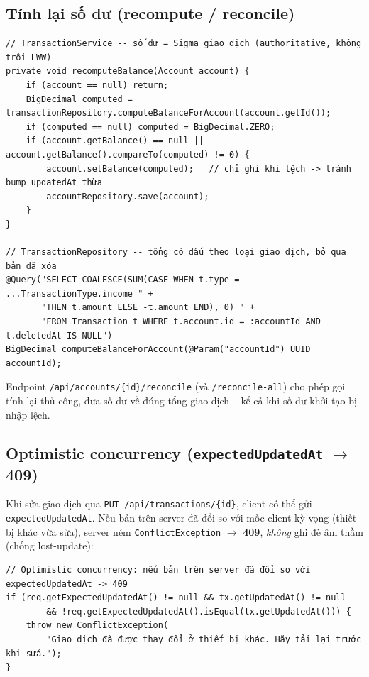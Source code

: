 \documentclass[11pt,a4paper]{article}
\begin{document}
\subsection{Tính lại số dư (recompute / reconcile)}

\begin{lstlisting}[style=java,caption={TransactionService.recomputeBalance \& truy vấn computeBalanceForAccount}]
// TransactionService -- số dư = Sigma giao dịch (authoritative, không trôi LWW)
private void recomputeBalance(Account account) {
    if (account == null) return;
    BigDecimal computed = transactionRepository.computeBalanceForAccount(account.getId());
    if (computed == null) computed = BigDecimal.ZERO;
    if (account.getBalance() == null || account.getBalance().compareTo(computed) != 0) {
        account.setBalance(computed);   // chỉ ghi khi lệch -> tránh bump updatedAt thừa
        accountRepository.save(account);
    }
}

// TransactionRepository -- tổng có dấu theo loại giao dịch, bỏ qua bản đã xóa
@Query("SELECT COALESCE(SUM(CASE WHEN t.type = ...TransactionType.income " +
       "THEN t.amount ELSE -t.amount END), 0) " +
       "FROM Transaction t WHERE t.account.id = :accountId AND t.deletedAt IS NULL")
BigDecimal computeBalanceForAccount(@Param("accountId") UUID accountId);
\end{lstlisting}

Endpoint \texttt{/api/accounts/\{id\}/reconcile} (và \texttt{/reconcile-all}) cho phép gọi tính
lại thủ công, đưa số dư về đúng tổng giao dịch -- kể cả khi số dư khởi tạo bị nhập lệch.

\subsection{Optimistic concurrency (\texttt{expectedUpdatedAt} $\rightarrow$ 409)}

Khi sửa giao dịch qua \texttt{PUT /api/transactions/\{id\}}, client có thể gửi
\texttt{expectedUpdatedAt}. Nếu bản trên server đã đổi so với mốc client kỳ vọng (thiết bị khác
vừa sửa), server ném \texttt{ConflictException} $\rightarrow$ \textbf{409}, \emph{không} ghi đè
âm thầm (chống lost-update):

\begin{lstlisting}[style=java,caption={TransactionService.updateTransaction -- optimistic concurrency check}]
// Optimistic concurrency: nếu bản trên server đã đổi so với expectedUpdatedAt -> 409
if (req.getExpectedUpdatedAt() != null && tx.getUpdatedAt() != null
        && !req.getExpectedUpdatedAt().isEqual(tx.getUpdatedAt())) {
    throw new ConflictException(
        "Giao dịch đã được thay đổi ở thiết bị khác. Hãy tải lại trước khi sửa.");
}
\end{lstlisting}
\end{document}
